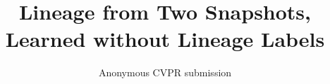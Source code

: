 \documentclass[10pt,twocolumn,letterpaper]{article}
\title{Lineage from Two Snapshots, Learned without Lineage Labels}
\author{Anonymous CVPR submission}
\begin{document}
\maketitle








{
    \small
    
    
}
\end{document}
